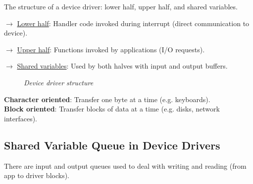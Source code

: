 \documentclass[11pt]{article}
\begin{document}
The structure of a device driver: lower half, upper half, and shared variables.

$\rightarrow$ \underline{Lower half}: Handler code invoked during interrupt (direct communication to device).

$\rightarrow$ \underline{Upper half}: Functions invoked by applications (I/O requests).

$\rightarrow$ \underline{Shared variables}: Used by both halves with input and output buffers.

\begin{figure}[htbp]
    \centering
    \caption{\textit{Device driver structure}}
\end{figure}

\begin{tcolorbox}[
    enhanced,
    attach boxed title to top left={xshift=6mm,yshift=-1.5mm},
    colback=moonstoneblue!20,
    colframe=moonstoneblue,
    colbacktitle=moonstoneblue,
    title=Types of Devices,
    fonttitle=\bfseries\color{white},
    boxed title style={size=small,colframe=moonstoneblue,sharp corners},
    sharp corners,
    label=box:logic-types,
]
    {\color{moondark}\textbf{Character oriented}}: Transfer one byte at a time (e.g. keyboards). \\
    {\color{moondark}\textbf{Block oriented}}: Transfer blocks of data at a time (e.g. disks, network interfaces).
\end{tcolorbox}

\subsection*{Shared Variable Queue in Device Drivers}

There are input and output queues used to deal with writing and reading (from app to driver blocks).
\end{document}

